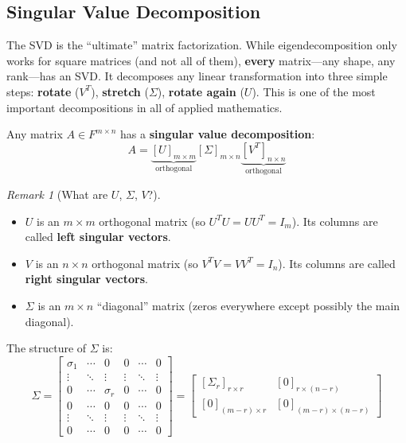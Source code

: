 \documentclass[11pt]{article}
\theoremstyle{definition}
\theoremstyle{plain}
\theoremstyle{remark}
\newtheorem{remark}[definition]{Remark}
\begin{document}
\subsection{Singular Value Decomposition}

\begin{intuitionbox}
The SVD is the ``ultimate'' matrix factorization. While eigendecomposition only works for square matrices (and not all of them), \textbf{every} matrix---any shape, any rank---has an SVD. It decomposes any linear transformation into three simple steps: \textbf{rotate} ($V^T$), \textbf{stretch} ($\Sigma$), \textbf{rotate again} ($U$). This is one of the most important decompositions in all of applied mathematics.
\end{intuitionbox}

Any matrix $A \in F^{m \times n}$ has a \textbf{singular value decomposition}:
\[
A = \underbrace{[U]_{m \times m}}_{\text{orthogonal}} [\Sigma]_{m \times n} \underbrace{[V^T]_{n \times n}}_{\text{orthogonal}}
\]

\begin{remark}[What are $U$, $\Sigma$, $V$?]
\begin{itemize}[nosep]
\item $U$ is an $m \times m$ orthogonal matrix (so $U^T U = UU^T = I_m$). Its columns are called \textbf{left singular vectors}.
\item $V$ is an $n \times n$ orthogonal matrix (so $V^T V = VV^T = I_n$). Its columns are called \textbf{right singular vectors}.
\item $\Sigma$ is an $m \times n$ ``diagonal'' matrix (zeros everywhere except possibly the main diagonal).
\end{itemize}
\end{remark}

The structure of $\Sigma$ is:
\[
\Sigma = \begin{bmatrix} \sigma_1 & \cdots & 0 & 0 & \cdots & 0 \\ \vdots & \ddots & \vdots & \vdots & \ddots & \vdots \\ 0 & \cdots & \sigma_r & 0 & \cdots & 0 \\ 0 & \cdots & 0 & 0 & \cdots & 0 \\ \vdots & \ddots & \vdots & \vdots & \ddots & \vdots \\ 0 & \cdots & 0 & 0 & \cdots & 0 \end{bmatrix} = \begin{bmatrix} [\Sigma_r]_{r \times r} & [0]_{r \times (n-r)} \\ [0]_{(m-r) \times r} & [0]_{(m-r) \times (n-r)} \end{bmatrix}
\]
\end{document}
